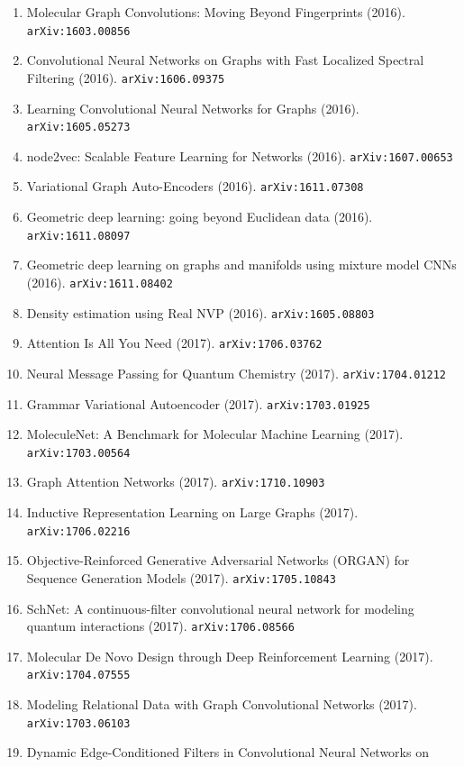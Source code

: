 \documentclass[11pt]{article}
\begin{document}
\begin{enumerate}
  of molecules (2016). \texttt{arXiv:1610.02415}
  \item Molecular Graph Convolutions: Moving Beyond Fingerprints (2016). \texttt{arXiv:1603.00856}
  \item Convolutional Neural Networks on Graphs with Fast Localized Spectral
  Filtering (2016). \texttt{arXiv:1606.09375}
  \item Learning Convolutional Neural Networks for Graphs (2016). \texttt{arXiv:1605.05273}
  \item node2vec: Scalable Feature Learning for Networks (2016). \texttt{arXiv:1607.00653}
  \item Variational Graph Auto-Encoders (2016). \texttt{arXiv:1611.07308}
  \item Geometric deep learning: going beyond Euclidean data (2016). \texttt{arXiv:1611.08097}
  \item Geometric deep learning on graphs and manifolds using mixture model CNNs (2016). \texttt{arXiv:1611.08402}
  \item Density estimation using Real NVP (2016). \texttt{arXiv:1605.08803}
  \item Attention Is All You Need (2017). \texttt{arXiv:1706.03762}
  \item Neural Message Passing for Quantum Chemistry (2017). \texttt{arXiv:1704.01212}
  \item Grammar Variational Autoencoder (2017). \texttt{arXiv:1703.01925}
  \item MoleculeNet: A Benchmark for Molecular Machine Learning (2017). \texttt{arXiv:1703.00564}
  \item Graph Attention Networks (2017). \texttt{arXiv:1710.10903}
  \item Inductive Representation Learning on Large Graphs (2017). \texttt{arXiv:1706.02216}
  \item Objective-Reinforced Generative Adversarial Networks (ORGAN) for
  Sequence Generation Models (2017). \texttt{arXiv:1705.10843}
  \item SchNet: A continuous-filter convolutional neural network for modeling
  quantum interactions (2017). \texttt{arXiv:1706.08566}
  \item Molecular De Novo Design through Deep Reinforcement Learning (2017). \texttt{arXiv:1704.07555}
  \item Modeling Relational Data with Graph Convolutional Networks (2017). \texttt{arXiv:1703.06103}
  \item Dynamic Edge-Conditioned Filters in Convolutional Neural Networks on

\end{enumerate}
\end{document}
